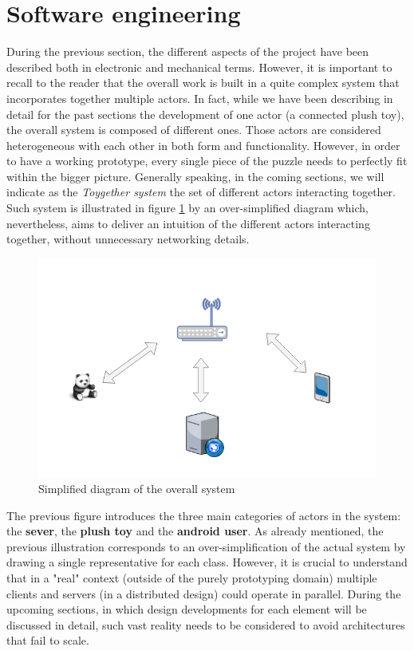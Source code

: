 \newpage
\section{Software engineering}
\label{sec:sw}

During the previous section, the different aspects of the project have been described both in electronic and mechanical terms. However, it is important to recall to the reader that the overall work is built in a quite complex system that incorporates together multiple actors. In fact, while we have been describing in detail for the past sections the development of one actor (a connected plush toy), the overall system is composed of different ones. Those actors are considered heterogeneous with each other in both form and functionality. However, in order to have a working prototype, every single piece of the puzzle needs to perfectly fit within the bigger picture. Generally speaking, in the coming sections, we will indicate as the \textit{Toygether system} the set of different actors interacting together. Such system is illustrated in figure \ref{fig:SE_network_diagram} by an over-simplified diagram which, nevertheless, aims to deliver an intuition of the different actors interacting together, without unnecessary networking details.

\begin{figure}[ht]
    \centering
    \includegraphics[scale=0.4]{images/SE_network_diagram.png}
    \caption{Simplified diagram of the overall system}
    \label{fig:SE_network_diagram}
\end{figure}

The previous figure introduces the three main categories of actors in the system: the \textbf{sever}, the \textbf{plush toy} and the \textbf{android user}. As already mentioned, the previous illustration corresponds to an over-simplification of the actual system by drawing a single representative for each class. However, it is crucial to understand that in a "real" context (outside of the purely prototyping domain) multiple clients and servers (in a distributed design) could operate in parallel. During the upcoming sections, in which design developments for each element will be discussed in detail, such vast reality needs to be considered to avoid architectures that fail to scale.


